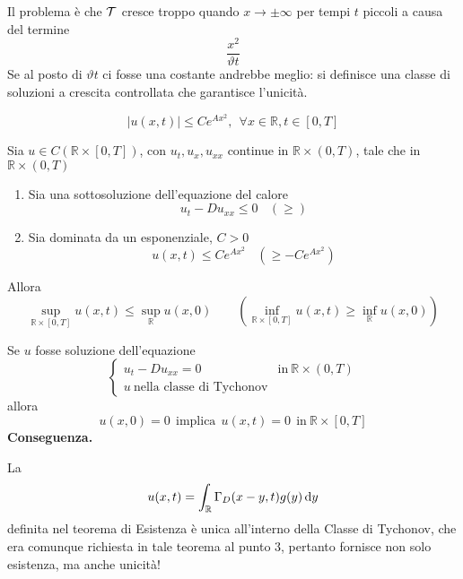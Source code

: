 Il problema è che $\mathcal{T} $ cresce troppo quando $x\rightarrow \pm \infty $ per tempi $t$ piccoli a causa del termine
\begin{equation*}
    \frac{x^{2}}{\vartheta t}
\end{equation*}
Se al posto di $\vartheta t$ ci fosse una costante andrebbe meglio: si definisce una classe di soluzioni a crescita controllata che garantisce l'unicità.
\begin{definition}
    \begin{equation*}
        | u(x,t)| \leq Ce^{Ax^{2}},\ \ \forall x\in \mathbb{R},t\in [ 0,T]
    \end{equation*}
\end{definition}
\begin{theorem}
     Sia $u\in C(\mathbb{R} \times [ 0,T])$, con $u_{t},u_{x},u_{xx}$ continue in $\mathbb{R} \times (0,T)$, tale che in $\mathbb{R} \times (0,T)$
    \begin{enumerate}
        \item Sia una sottosoluzione dell'equazione del calore
              \begin{equation*}
                  u_{t} -Du_{xx} \leq 0\ \ \ \ (\geq)
              \end{equation*}
        \item Sia dominata da un esponenziale, $C >0$
              \begin{equation*}
                  u(x,t) \leq Ce^{Ax^{2}} \ \ \ \ \left(\geq -Ce^{Ax^{2}}\right)
              \end{equation*}
    \end{enumerate}
    Allora
    \begin{equation*}
        \sup _{\mathbb{R} \times [ 0,T]} u(x,t) \leq \sup _{\mathbb{R}} u(x,0) \qquad \left(\inf_{\mathbb{R} \times [ 0,T]} u(x,t) \geq \inf_{\mathbb{R}} u(x,0)\right)
    \end{equation*}
\end{theorem}

Se $u$ fosse soluzione dell'equazione
\begin{equation*}
    \begin{cases}
        u_{t} -Du_{xx} =0                  & \text{in} \ \mathbb{R} \times (0,T) \\
        u\ \text{nella classe di Tychonov} &
    \end{cases}
\end{equation*}
allora
\begin{equation*}
    u(x,0) =0\ \ \text{implica} \ \ u(x,t) =0\ \ \text{in} \ \mathbb{R} \times [ 0,T]
\end{equation*}
\textbf{Conseguenza.}

La
\begin{equation*}
    u(x,t) =\int _{\mathbb{R}} \Gamma _{D}(x-y,t) g(y) \,\mathrm d y
\end{equation*}
definita nel teorema di Esistenza è unica all'interno della Classe di Tychonov, che era comunque richiesta in tale teorema al punto $3$, pertanto fornisce non solo esistenza, ma anche unicità!